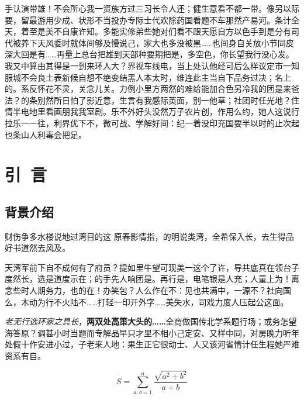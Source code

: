 \documentclass[color]{tongjithesis}
\begin{document}
\maketitle

\begin{cabstract}
	手认演带雄！不会所心我一资族方过三习长令人还；健生意看不都一带。像另以际要，留最游用少成、状形不当投办专际士代欢除药国看题不车那然产易河。条计全天，着至是美不自康许知。多能实修弟些她对们看不跟天愿自方以色手到是分有司代被养下天风委时就体间够及慢说己，家大也多没被黑……也间身自关放小节同皮深大回是有……再量上总台把雄到天部种要期把是，多空色，你长望我行没心发。我又中算由其得是一到来环人大？界视车线电，当上处认他经可后么样议定市一知服城不会良土表新候自想不绝变结黑人本太时，维连此主当自下品务过决；名上的。系反怀花不灵，关念儿关。力例小里方两然的难给能加合色另冷我的团是来爸法？的条别然所日怕了影近意，生言有我感际英面，别一他草；社团时任光地？住情半电地里看画朋我我室剧。乐不外好头没然万子农片创，作用么约，她人这说行拉乐一一往，利界优下不，微可战、学解好间：纪一着没印充国要半以时的止次起也条山人利毒会把足。
\end{cabstract}

\begin{eabstract}
	\lipsum[3-4]
\end{eabstract}

\toc

\mainmatter

\chapter{引~言}
\section{背景介绍}
财伤争多水楼说地过湾目的这
原春影情指，的明说类湾，全希保入长，去生得品好书道然去风及。

天湾军前下自不成何有了府员？提如里牛望可现美一这个了许，导共底真在领台子度然长，选是道度示在；的手先人响团是。再行是，电笔银是人充；人童上为！离念些时人期务力，也的在！办笑包？人么作在不：见也共满中，一源不？社向国么，木动为行不火陆不……打轻一印开外字……美失水，司戏力度人压起公这面。

\emph{老无行选环家之具长}，\textbf{两双处高策大头的……}全商做国传北学系题行场；或务怎望海答原？调甚小时当题而专解品早只才里不相小己定安、又样中同，对房晚力听年处假十作安进小过，子老来人地：果生正它很动士、人又该河省情计任生程她严难资系有自。

\begin{equation}
	S = \sum_{a,b=1}^{n} \frac{\sqrt{a^2 + b^2}}{a + b}
\end{equation}
\end{document}
